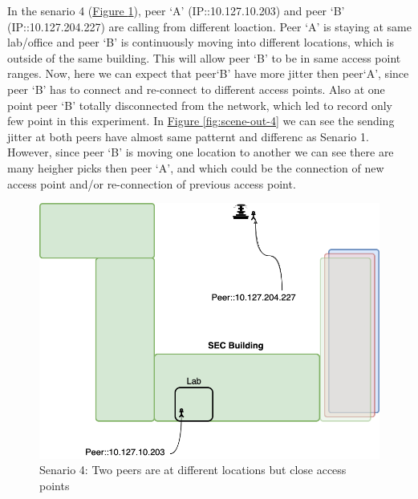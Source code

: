 	In the senario 4 (\hyperref[fig:scene-4]{Figure \ref{fig:scene-4}}), peer `A' (IP::10.127.10.203) and peer `B' (IP::10.127.204.227) are calling from different loaction. Peer `A' is staying at same lab/office and peer `B' is continuously moving into different locations, which is outside of the same building. This will allow peer `B' to be in same access point ranges. Now, here we can expect that peer`B' have more jitter then peer`A', since peer `B' has to connect and re-connect to different access points. Also at one point peer `B' totally disconnected from the network, which led to record only few point in this experiment. In \hyperref[fig:scene-out-4]{Figure \ref{fig:scene-out-4}} we can see the sending jitter at both peers have almost same patternt and differenc as Senario 1. However, since peer `B' is moving one location to another we can see there are many heigher picks then peer `A', and which could be the connection of new access point and/or re-connection of previous access point.
	\begin{figure}[thb]
		\begin{minipage}{\textwidth}
			\includegraphics[scale=0.29]{Images/experiment/senarios/near_fountain.drawio.png}
		\end{minipage}
		\caption{Senario 4: Two peers are at different locations but close access points}
		\label{fig:scene-4}
	\end{figure}

